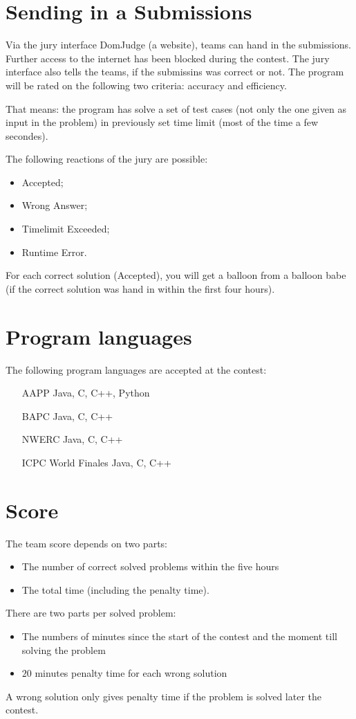 \section{Sending in a Submissions}
Via the jury interface DomJudge (a website), teams can hand in the submissions. Further access to the internet has been blocked during the contest. The jury interface also tells the teams, if the submissins was correct or not. The program will be rated on the following two criteria: accuracy and efficiency.

That means: the program has solve a set of test cases (not only the one given as input in the problem) in previously set time limit (most of the time a few secondes).

The following reactions of the jury are possible:
\begin{itemize}
\item Accepted;
\item Wrong Answer;
\item Timelimit Exceeded;
\item Runtime Error.
\end{itemize}
For each correct solution (Accepted), you will get a balloon from a balloon babe (if the correct solution was hand in within the first four hours).

\section{Program languages}
The following program languages are accepted at the contest:
\begin{itemize}
\item[AAPP] Java, C, C++, Python
\item[BAPC] Java, C, C++
\item[NWERC] Java, C,  C++
\item[ICPC World Finales] Java, C, C++
\end{itemize}

\section{Score}
The team score depends on two parts:
\begin{itemize}
\item The number of correct solved problems within the five hours
\item The total time (including the penalty time).
\end{itemize}
%
There are two parts per solved problem:
\begin{itemize}
\item The numbers of minutes since the start of the contest and the moment till solving the problem %
\item $20$ minutes penalty time for each wrong solution %
\end{itemize}
A wrong solution only gives penalty time if the problem is solved later the contest.

